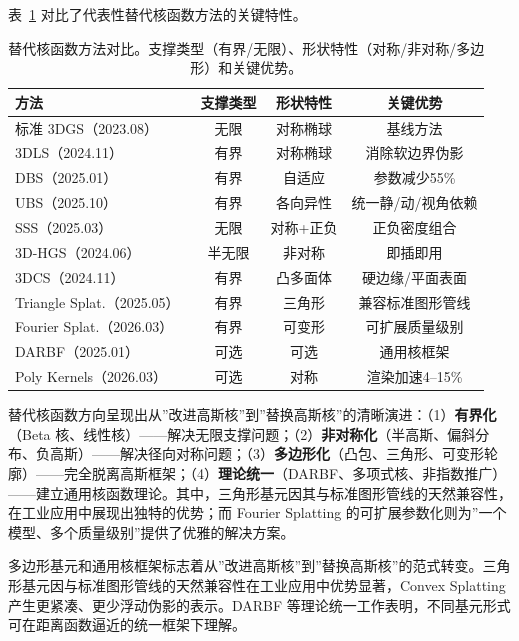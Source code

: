 
表~\ref{tab:03_kernel_compare} 对比了代表性替代核函数方法的关键特性。

\begin{table}[htbp]
\centering
\caption{替代核函数方法对比。支撑类型（有界/无限）、形状特性（对称/非对称/多边形）和关键优势。}
\label{tab:03_kernel_compare}
\small
\begin{tabular}{lccc}
\toprule
\textbf{方法} & \textbf{支撑类型} & \textbf{形状特性} & \textbf{关键优势} \\
\midrule
标准 3DGS（2023.08）~\cite{2308_04079} & 无限 & 对称椭球 & 基线方法 \\
3DLS（2024.11）~\cite{2411_12440} & 有界 & 对称椭球 & 消除软边界伪影 \\
DBS（2025.01）~\cite{2501_18630} & 有界 & 自适应 & 参数减少55\% \\
UBS（2025.10）~\cite{2510_03312} & 有界 & 各向异性 & 统一静/动/视角依赖 \\
SSS（2025.03）~\cite{2503_10148} & 无限 & 对称+正负 & 正负密度组合 \\
3D-HGS（2024.06）~\cite{2406_02720} & 半无限 & 非对称 & 即插即用 \\
3DCS（2024.11）~\cite{2411_14974} & 有界 & 凸多面体 & 硬边缘/平面表面 \\
Triangle Splat.（2025.05）~\cite{2505_19175} & 有界 & 三角形 & 兼容标准图形管线 \\
Fourier Splat.（2026.03）~\cite{2603_19834} & 有界 & 可变形 & 可扩展质量级别 \\
DARBF（2025.01）~\cite{2501_12369} & 可选 & 可选 & 通用核框架 \\
Poly Kernels（2026.03）~\cite{2603_18707} & 可选 & 对称 & 渲染加速4--15\% \\
\bottomrule
\end{tabular}
\end{table}

替代核函数方向呈现出从”改进高斯核”到”替换高斯核”的清晰演进：（1）\textbf{有界化}（Beta 核、线性核）——解决无限支撑问题；（2）\textbf{非对称化}（半高斯、偏斜分布、负高斯）——解决径向对称问题；（3）\textbf{多边形化}（凸包、三角形、可变形轮廓）——完全脱离高斯框架；（4）\textbf{理论统一}（DARBF、多项式核、非指数推广）——建立通用核函数理论。其中，三角形基元因其与标准图形管线的天然兼容性，在工业应用中展现出独特的优势；而 Fourier Splatting 的可扩展参数化则为”一个模型、多个质量级别”提供了优雅的解决方案。

\begin{takeaway}
多边形基元和通用核框架标志着从”改进高斯核”到”替换高斯核”的范式转变。三角形基元因与标准图形管线的天然兼容性在工业应用中优势显著，Convex Splatting 产生更紧凑、更少浮动伪影的表示。DARBF 等理论统一工作表明，不同基元形式可在距离函数逼近的统一框架下理解。
\end{takeaway}

